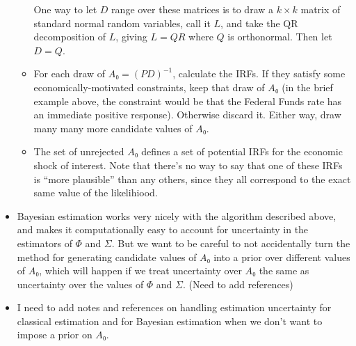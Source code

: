 \begin{itemize}
\begin{itemize}
    One way to let $D$ range over these matrices is to draw a $k×k$
    matrix of standard normal random variables, call it $L$, and take
    the QR decomposition of $L$, giving $L=QR$ where $Q$ is
    orthonormal.  Then let $D=Q$.
  \item For each draw of $A₀=(PD)^{-1}$, calculate the IRFs.  If they
    satisfy some economically-motivated constraints, keep that draw of
    $A₀$ (in the brief example above, the constraint would be that the
    Federal Funds rate has an immediate positive response).  Otherwise
    discard it.  Either way, draw many many more candidate values of
    $A₀$.
  \item The set of unrejected $A₀$ defines a set of potential IRFs for
    the economic shock of interest.  Note that there's no way to say
    that one of these IRFs is ``more plausible'' than any others,
    since they all correspond to the exact same value of the
    likelihiood.
  \end{itemize}
\item Bayesian estimation works very nicely with the algorithm
  described above, and makes it computationally easy to account for
  uncertainty in the estimators of $Φ$ and $Σ$.  But we want to be
  careful to not accidentally turn the method for generating candidate
  values of $A₀$ into a prior over different values of $A₀$, which
  will happen if we treat uncertainty over $A₀$ the same as
  uncertainty over the values of $Φ$ and $Σ$.  (Need to add references)
\item I need to add notes and references on handling estimation
  uncertainty for classical estimation and for Bayesian estimation
  when we don't want to impose a prior on $A₀$.
\end{itemize}

